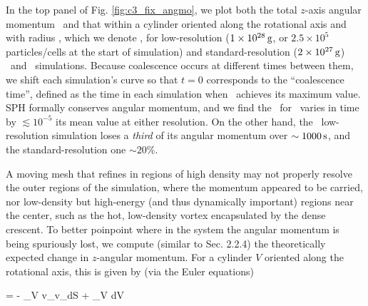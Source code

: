 In the top panel of Fig. \ref{fig:c3_fix_angmo}, we plot both the total $z$-axis angular momentum \Lztot\ and that within a cylinder oriented along the rotational axis and with radius \innercyl, which we denote \Lzinner, for low-resolution ($1\times10^{28}\,\mathrm{g}$, or $2.5\times10^{5}$ particles/cells at the start of simulation) and standard-resolution ($2\times10^{27}\,\mathrm{g}$) \gasoline\ and \arepo\ simulations.  Because coalescence occurs at different times between them, we shift each simulation's curve so that $t = 0$ corresponds to the ``coalescence time'', defined as the time in each simulation when \Lzinner\ achieves its maximum value.  SPH formally conserves angular momentum, and we find the \Lztot\ for \gasoline\ varies in time by $\lesssim10^{-5}$ its mean value at either resolution.  On the other hand, the \arepo\ low-resolution simulation loses a \textit{third} of its angular momentum over $\sim1000\,\mathrm{s}$, and the standard-resolution one $\sim20$\%.  


A moving mesh that refines in regions of high density may not properly resolve the outer regions of the simulation, where the momentum appeared to be carried, nor low-density but high-energy (and thus dynamically important) regions near the center, such as the hot, low-density vortex encapsulated by the dense crescent.  To better poinpoint where in the system the angular momentum is being spuriously lost, we compute (similar to \cite{ji+13} Sec. 2.2.4) the theoretically expected change in $z$-angular momentum.  For a cylinder $V$ oriented along the rotational axis, this is given by (via the Euler equations)

\eqbegin
{} = - \oint_V \rho \varpi v_\phi v_\varpi dS + \int_V {\bf \varpi}\times{\bf \nabla}\Phi dV
\label{eq:c3_angmobalance}
\eqend



